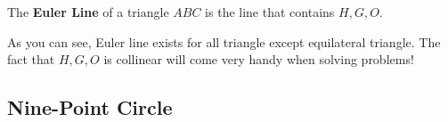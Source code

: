 \documentclass[../../../main.tex]{subfiles}
\begin{document}
\begin{definition}{}{}
The \textbf{Euler Line} of a triangle $ABC$ is the line that contains
$H, G, O$.
\end{definition}

As you can see, Euler line exists for all triangle except equilateral
triangle. The fact that $H, G, O$ is collinear will come very handy
when solving problems!

\subsection{Nine-Point Circle}
\end{document}
